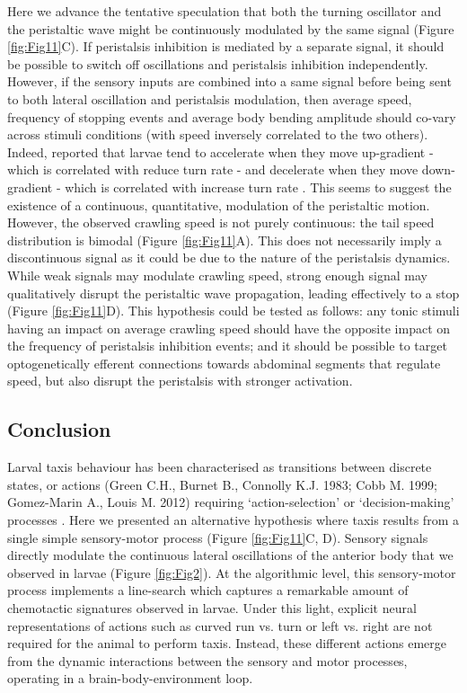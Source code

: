 \documentclass[10pt,a4paper]{article}
\begin{document}
Here we advance the tentative speculation that both the turning oscillator and the peristaltic wave might be continuously modulated by the same signal (Figure \ref{fig:Fig11}C).  If peristalsis inhibition is mediated by a separate signal, it should be possible to switch off oscillations and peristalsis inhibition independently. However, if the sensory inputs are combined into a same signal before being sent to both lateral oscillation and peristalsis modulation, then average speed, frequency of stopping events and average body bending amplitude should co-vary across stimuli conditions (with speed inversely correlated to the two others). Indeed, \cite{gomez2014multilevel} reported that larvae tend to accelerate when they move up-gradient - which is correlated with reduce turn rate \citep{schleyer2015learning} - and decelerate when they move down-gradient - which is correlated with increase turn rate \citep{schleyer2015learning}. This seems to suggest the existence of a continuous, quantitative, modulation of the peristaltic motion. However, the observed crawling speed is not purely continuous: the tail speed distribution is bimodal (Figure \ref{fig:Fig11}A). This does not necessarily imply a discontinuous signal as it could be due to the nature of the peristalsis dynamics. While weak signals may modulate crawling speed, strong enough signal may qualitatively disrupt the peristaltic wave propagation, leading effectively to a stop (Figure \ref{fig:Fig11}D). This hypothesis could be tested as follows: any tonic stimuli having an impact on average crawling speed should have the opposite impact on the frequency of peristalsis inhibition events; and it should be possible to target optogenetically efferent connections towards abdominal segments that regulate speed, but also disrupt the peristalsis with stronger activation.
 

\subsection{Conclusion}
Larval taxis behaviour has been characterised as transitions between discrete states, or actions (Green C.H., Burnet B., Connolly K.J. 1983; Cobb M. 1999; Gomez-Marin A., Louis M. 2012) requiring ‘action-selection’ or ‘decision-making’ processes \citep{gomez2014multilevel}. Here we presented an alternative hypothesis where taxis results from a single simple sensory-motor process (Figure \ref{fig:Fig11}C, D). Sensory signals directly modulate the continuous lateral oscillations of the anterior body that we observed in larvae (Figure \ref{fig:Fig2}). At the algorithmic level, this sensory-motor process implements a line-search \cite[see][]{snyman2005line} which captures a remarkable amount of chemotactic signatures observed in larvae. Under this light, explicit neural representations of actions such as curved run vs. turn or left vs. right are not required for the animal to perform taxis. Instead, these different actions emerge from the dynamic interactions between the sensory and motor processes, operating in a brain-body-environment loop.
\end{document}
